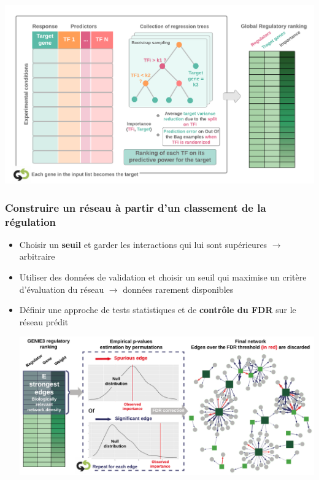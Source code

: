 \begin{frame}
\begin{center}
\begin{overprint}
        \includegraphics[scale = 0.38]{Figures/Regression/rf4.png}
    \end{overprint}
    \end{center}
\end{frame}




\begin{frame}
    \frametitle{\small Construire un réseau à partir d'un classement de la régulation}
    \vspace{-0.2cm}
        \begin{itemize}\scriptsize
            \item  Choisir un \textbf{seuil} et garder les interactions qui lui sont supérieures $\rightarrow$ arbitraire
             \item Utiliser des données de validation et choisir un seuil qui maximise un critère d'évaluation du réseau $\rightarrow$ données rarement disponibles
             \item  Définir une approche de tests statistiques et de \textbf{contrôle du FDR} sur le réseau prédit 
            
            \includegraphics[scale = 0.33]{Figures/Regression/method.png} \cite{Cassan2021}
        \end{itemize}
        
\end{frame}




